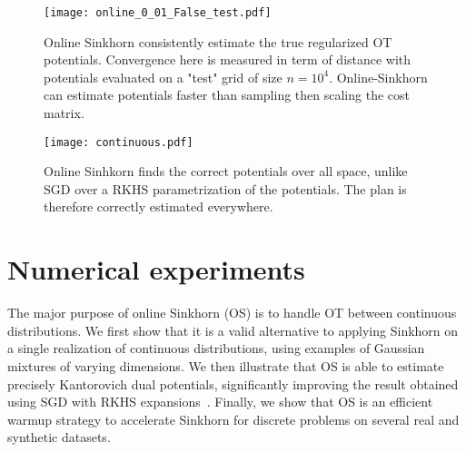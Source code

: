 \begin{figure}[t]
    \centering
    \begin{widepage}
    \texttt{[image: online\_0\_01\_False\_test.pdf]}
    \end{widepage}
    \caption{Online Sinkhorn consistently estimate the true regularized OT potentials. Convergence here is measured in term of distance with potentials evaluated on a "test" grid of size $n=10^4$. Online-Sinkhorn can estimate potentials faster than sampling then scaling the cost matrix.}
    \label{fig:convergence}
\end{figure}

\begin{figure}[t]
    \centering
    \begin{widepage}
    \texttt{[image: continuous.pdf]}
    \end{widepage}
    \caption{Online Sinhkorn finds the correct potentials over all space, unlike SGD over a RKHS parametrization of the potentials. The plan is therefore correctly estimated everywhere.}
    \label{fig:potentials}
    \vspace{-1em}
\end{figure}

\section{Numerical experiments}\label{sec:exps}



The major purpose of online Sinkhorn (OS) is to handle OT between continuous
distributions.  We first show that it is a valid alternative to applying Sinkhorn
on a single realization of continuous distributions, using examples of Gaussian mixtures of varying dimensions.
%
We then illustrate that OS is able to estimate precisely
Kantorovich dual potentials, significantly improving the result obtained using SGD with RKHS
expansions~\citep{2016-genevay-nips}.
%
Finally, we show that OS is an efficient warmup strategy to accelerate Sinkhorn for discrete problems on several real and synthetic datasets.


